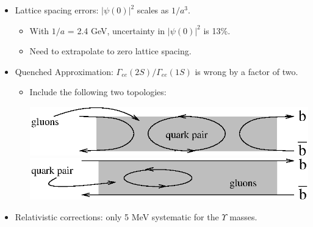 \begin{slide*}

\slideframe{}
\LARGE

\begin{minipage}{\linewidth}

\vspace{1cm}


\begin{itemize}

  \item Lattice spacing errors: $\left| \psi(0) \right|^2$ scales as $1/a^3$.
  \begin{itemize}

    \item With $1/a$ = 2.4 GeV, uncertainty in $\left| \psi(0)
    \right|^2$ is 13\%.

    \item Need to extrapolate to zero lattice spacing.

  \end{itemize}

  \vfill

  \item Quenched Approximation: $\Gamma_{ee}(2S) / \Gamma_{ee}(1S)$ is
  wrong by a factor of two.
  \begin{itemize}

    \item Include the following two topologies:

    \vfill

    \begin{center}
      \includegraphics{unquenched2.eps} \\
      \vfill
      \includegraphics{unquenched1.eps}
    \end{center}

  \end{itemize}

  \vfill

  \item Relativistic corrections: only 5 MeV systematic for the
  $\Upsilon$ masses.

\end{itemize}

\vfill

\end{minipage}

\end{slide*}

